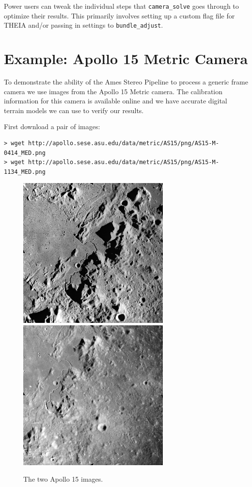 Power users can tweak the individual steps that \texttt{camera\_solve} goes through
to optimize their results.  This primarily involves setting up a custom flag file for
THEIA and/or passing in settings to \texttt{bundle\_adjust}.

\section{Example: Apollo 15 Metric Camera}
\label{sfm:generic}

To demonstrate the ability of the Ames Stereo Pipeline to process a
generic frame camera we use images from the Apollo 15 Metric camera.  The
 calibration information for this camera is available online and we have accurate
 digital terrain models we can use to verify our results.

First download a pair of images:

\begin{verbatim}
> wget http://apollo.sese.asu.edu/data/metric/AS15/png/AS15-M-0414_MED.png
> wget http://apollo.sese.asu.edu/data/metric/AS15/png/AS15-M-1134_MED.png
\end{verbatim}

\begin{figure}[h!]
\centering
  \includegraphics[width=3.0in]{images/examples/pinhole/AS15-M-0414.png}
  \includegraphics[width=3.0in]{images/examples/pinhole/AS15-M-1134.png}
\caption{The two Apollo 15 images.}
\label{fig:pinhole-a15-input-images}
\end{figure}

